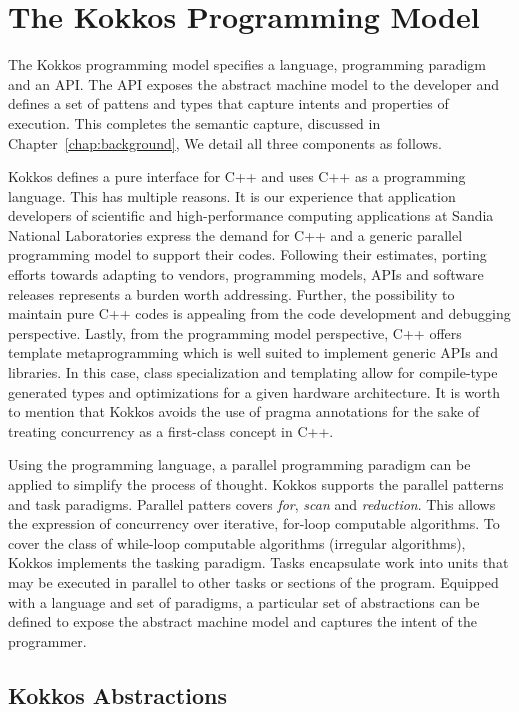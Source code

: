 \section{The Kokkos Programming Model}\label{chap:kokkosPM}

The Kokkos programming model specifies a language, programming paradigm and an API. The API exposes the abstract machine model to the developer and defines a set of pattens and types that capture intents and properties of execution. This completes the semantic capture, discussed in Chapter~\ref{chap:background}, We detail all three components as follows.

Kokkos defines a pure interface for C++ and uses C++ as a programming language. This has multiple reasons. It is our experience that application developers of scientific and high-performance computing applications at Sandia National Laboratories express the demand for C++ and a generic parallel programming model to support their codes. Following their estimates, porting efforts towards adapting to vendors, programming models, APIs and software releases represents a burden worth addressing. Further, the possibility to maintain pure C++ codes is appealing from the code development and debugging perspective. 
Lastly, from the programming model perspective, C++ offers template metaprogramming which is well suited to implement generic APIs and libraries. In this case, class specialization and templating allow for compile-type generated types and optimizations for a given hardware architecture. It is worth to mention that Kokkos avoids the use of pragma annotations for the sake of treating concurrency as a first-class concept in C++.

Using the programming language, a parallel programming paradigm can be applied to simplify the process of thought. Kokkos supports the parallel patterns and task paradigms. Parallel patters covers \emph{for}, \emph{ scan} and \emph{reduction}. This allows the expression of concurrency over iterative, for-loop computable algorithms. To cover the class of while-loop computable algorithms (irregular algorithms), Kokkos implements the tasking paradigm. Tasks encapsulate work into units that may be executed in parallel to other tasks or sections of the program. Equipped with a language and set of paradigms, a particular set of abstractions can be defined to expose the abstract machine model and captures the intent of the programmer.

\subsection{Kokkos Abstractions}

